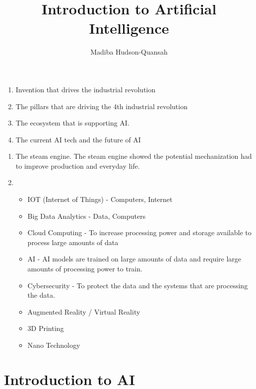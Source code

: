 \documentclass[12pt letter]{report}
\title{\Huge{Introduction to Artificial Intelligence}}
\author{\huge{Madiba Hudson-Quansah}}
\date{}
\begin{document}
\maketitle
\newpage
{}
\tableofcontents
\pagebreak

\begin{enumerate}
  \item Invention that drives the industrial revolution
  \item The pillars that are driving the 4th industrial revolution
  \item The ecosystem that is supporting AI.
  \item The current AI tech and the future of AI
\end{enumerate}



\begin{enumerate}
  \item The steam engine. The steam engine showed the potential mechanization had to improve production and everyday
        life.
  \item
        \begin{itemize}
          \item IOT (Internet of Things) - Computers, Internet
          \item Big Data Analytics - Data, Computers
          \item Cloud Computing - To increase processing power and storage available to process large amounts of data
          \item AI - AI models are trained on large amounts of data and require large amounts of processing power to train.
          \item Cybersecurity - To protect the data and the systems that are processing the data.
          \item Augmented Reality / Virtual Reality
          \item 3D Printing
          \item  Nano Technology
        \end{itemize}
\end{enumerate}

\chapter{Introduction to AI}
\end{document}
